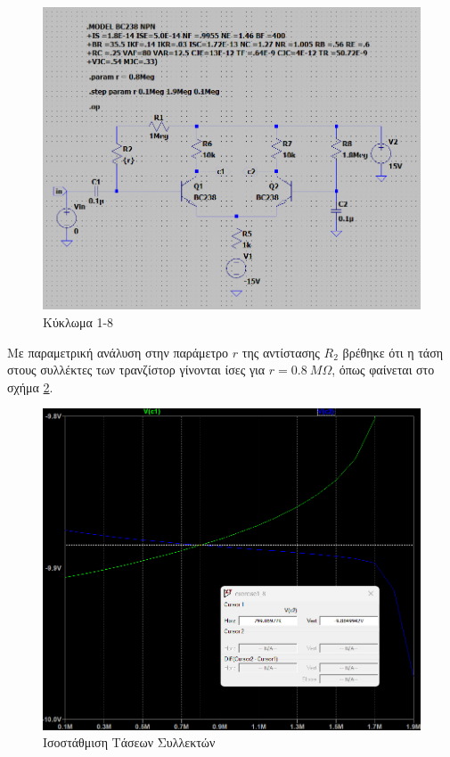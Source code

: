 \documentclass[11pt,a4paper,twoside,onecolumn,openright,final]{memoir}
\begin{document}
\begin{figure}[h]
\centerfloat%
\includegraphics[width=12.0cm]{figures/exercise1circuit3.png}
\caption{Κύκλωμα 1-8}\label{fig:ex1circuit3}
\end{figure}

Με παραμετρική ανάλυση στην παράμετρο \(r\) της αντίστασης \(R_2\) βρέθηκε ότι η τάση στους συλλέκτες των τρανζίστορ γίνονται ίσες για \(r = 0.8 \ M\Omega\), όπως φαίνεται στο σχήμα \ref{fig:ex1plot3}.

\begin{figure}[h]
\centerfloat%
\includegraphics[width=12.0cm]{figures/exercise1plot3.png}
\caption{Ισοστάθμιση Τάσεων Συλλεκτών}\label{fig:ex1plot3}
\end{figure}
\end{document}
